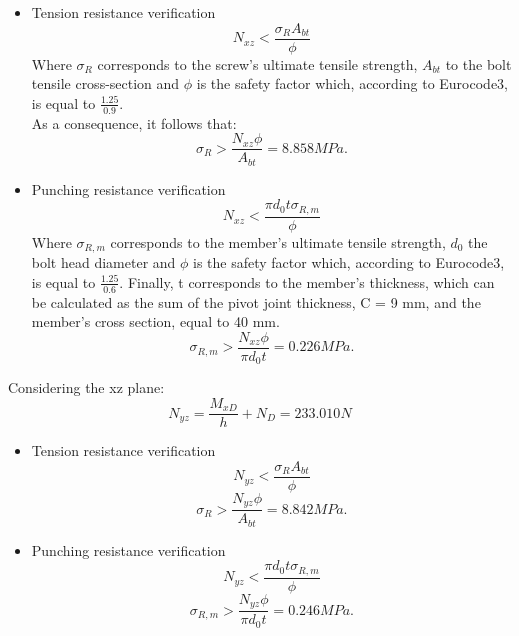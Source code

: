 \begin{itemize}
    \item Tension resistance verification\\
    \begin{equation}
        N_{xz} < \frac{\sigma_{R}A_{bt}}{\phi}
    \end{equation}
    Where $\sigma_{R}$ corresponds to the screw's ultimate tensile strength, $A_{bt}$ to the bolt tensile cross-section and $\phi$ is the safety factor which, according to Eurocode3, is equal to $\frac{1.25}{0.9}$.\\
    As a consequence, it follows that:
    \begin{equation}
       \sigma_{R} > \frac{N_{xz}\phi}{A_{bt}} = 8.858 MPa.
    \end{equation}
    \item Punching resistance verification\\
    \begin{equation}
        N_{xz} < \frac{\pi d_{0} t \sigma_{R,m}}{\phi}
    \end{equation}
    Where $\sigma_{R,m}$ corresponds to the member's ultimate tensile strength, $d_{0}$ the bolt head diameter and $\phi$ is the safety factor which, according to Eurocode3, is equal to $\frac{1.25}{0.6}$. Finally, t corresponds to the member's thickness, which can be calculated as the sum of the pivot joint thickness, C = 9 mm, and the member's cross section, equal to 40 mm. \\
     \begin{equation}
       \sigma_{R,m} > \frac{N_{xz}\phi}{\pi d_{0}t} = 0.226 MPa.
    \end{equation}
\end{itemize}
Considering the xz plane:\\
\begin{equation}
    N_{yz} = \frac{M_{xD}}{h} + N_{D} = 233.010 N
\end{equation}
\begin{itemize}
    \item Tension resistance verification\\
    \begin{equation}
        N_{yz} < \frac{\sigma_{R}A_{bt}}{\phi}
    \end{equation}
    \begin{equation}
       \sigma_{R} > \frac{N_{yz}\phi}{A_{bt}} = 8.842 MPa.
    \end{equation}
    \item Punching resistance verification\\
    \begin{equation}
        N_{yz} < \frac{\pi d_{0} t \sigma_{R,m}}{\phi}
    \end{equation}
    \begin{equation}
       \sigma_{R,m} > \frac{N_{yz}\phi}{\pi d_{0}t} = 0.246 MPa.
    \end{equation}
\end{itemize}
